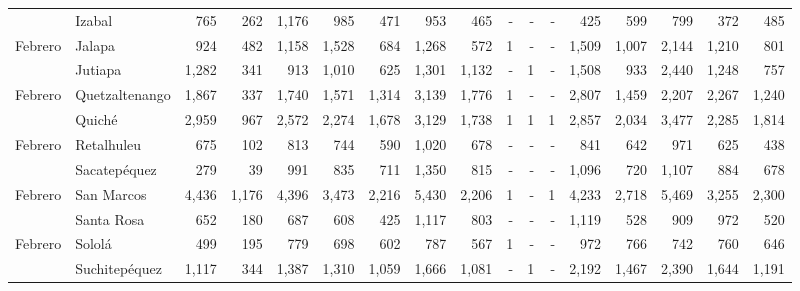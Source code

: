 \begin{landscape}
\begin{center}
\begin{longtable}{llrrrrrrrrrrrrrrr}
\rowcolor{color1!5!white}\multicolumn{1}{l}{	\footnotesize	 Febrero 	}&	 Izabal 	&	 765 	&	 262 	&	 1,176 	&	 985 	&	 471 	&	 953 	&	 465 	&	 -   	&	 -   	&	 -   	&	 425 	&	 599 	&	 799 	&	 372 	&	 485 	\\
\multicolumn{1}{l}{	\footnotesize	 Febrero 	}&	 Jalapa 	&	 924 	&	 482 	&	 1,158 	&	 1,528 	&	 684 	&	 1,268 	&	 572 	&	 1 	&	 -   	&	 -   	&	 1,509 	&	 1,007 	&	 2,144 	&	 1,210 	&	 801 	\\
\rowcolor{color1!5!white}\multicolumn{1}{l}{	\footnotesize	 Febrero 	}&	 Jutiapa 	&	 1,282 	&	 341 	&	 913 	&	 1,010 	&	 625 	&	 1,301 	&	 1,132 	&	 -   	&	 1 	&	 -   	&	 1,508 	&	 933 	&	 2,440 	&	 1,248 	&	 757 	\\
\multicolumn{1}{l}{	\footnotesize	 Febrero 	}&	 Quetzaltenango 	&	 1,867 	&	 337 	&	 1,740 	&	 1,571 	&	 1,314 	&	 3,139 	&	 1,776 	&	 1 	&	 -   	&	 -   	&	 2,807 	&	 1,459 	&	 2,207 	&	 2,267 	&	 1,240 	\\
\rowcolor{color1!5!white}\multicolumn{1}{l}{	\footnotesize	 Febrero 	}&	 Quiché 	&	 2,959 	&	 967 	&	 2,572 	&	 2,274 	&	 1,678 	&	 3,129 	&	 1,738 	&	 1 	&	 1 	&	 1 	&	 2,857 	&	 2,034 	&	 3,477 	&	 2,285 	&	 1,814 	\\
\multicolumn{1}{l}{	\footnotesize	 Febrero 	}&	 Retalhuleu 	&	 675 	&	 102 	&	 813 	&	 744 	&	 590 	&	 1,020 	&	 678 	&	 -   	&	 -   	&	 -   	&	 841 	&	 642 	&	 971 	&	 625 	&	 438 	\\
\rowcolor{color1!5!white}\multicolumn{1}{l}{	\footnotesize	 Febrero 	}&	 Sacatepéquez 	&	 279 	&	 39 	&	 991 	&	 835 	&	 711 	&	 1,350 	&	 815 	&	 -   	&	 -   	&	 -   	&	 1,096 	&	 720 	&	 1,107 	&	 884 	&	 678 	\\
\multicolumn{1}{l}{	\footnotesize	 Febrero 	}&	 San Marcos 	&	 4,436 	&	 1,176 	&	 4,396 	&	 3,473 	&	 2,216 	&	 5,430 	&	 2,206 	&	 1 	&	 -   	&	 1 	&	 4,233 	&	 2,718 	&	 5,469 	&	 3,255 	&	 2,300 	\\
\rowcolor{color1!5!white}\multicolumn{1}{l}{	\footnotesize	 Febrero 	}&	 Santa Rosa 	&	 652 	&	 180 	&	 687 	&	 608 	&	 425 	&	 1,117 	&	 803 	&	 -   	&	 -   	&	 -   	&	 1,119 	&	 528 	&	 909 	&	 972 	&	 520 	\\
\multicolumn{1}{l}{	\footnotesize	 Febrero 	}&	 Sololá 	&	 499 	&	 195 	&	 779 	&	 698 	&	 602 	&	 787 	&	 567 	&	 1 	&	 -   	&	 -   	&	 972 	&	 766 	&	 742 	&	 760 	&	 646 	\\
\rowcolor{color1!5!white}\multicolumn{1}{l}{	\footnotesize	 Febrero 	}&	 Suchitepéquez 	&	 1,117 	&	 344 	&	 1,387 	&	 1,310 	&	 1,059 	&	 1,666 	&	 1,081 	&	 -   	&	 1 	&	 -   	&	 2,192 	&	 1,467 	&	 2,390 	&	 1,644 	&	 1,191 	\\

\end{longtable}
\end{center}
\end{landscape}
